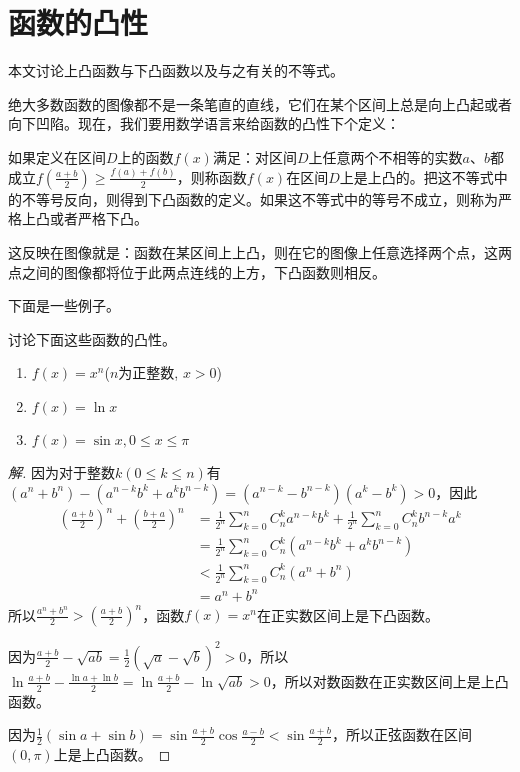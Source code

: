 
\section{函数的凸性}

本文讨论上凸函数与下凸函数以及与之有关的不等式。

绝大多数函数的图像都不是一条笔直的直线，它们在某个区间上总是向上凸起或者向下凹陷。现在，我们要用数学语言来给函数的凸性下个定义：
\begin{definition}
 如果定义在区间$D$上的函数$f(x)$满足：对区间$D$上任意两个不相等的实数$a$、$b$都成立$f(\frac{a+b}{2}) \geqslant \frac{f(a)+f(b)}{2}$，则称函数$f(x)$在区间$D$上是上凸的。把这不等式中的不等号反向，则得到下凸函数的定义。如果这不等式中的等号不成立，则称为严格上凸或者严格下凸。
\end{definition}
这反映在图像就是：函数在某区间上上凸，则在它的图像上任意选择两个点，这两点之间的图像都将位于此两点连线的上方，下凸函数则相反。

下面是一些例子。

\begin{example}
  讨论下面这些函数的凸性。
  \begin{enumerate}
  \item $f(x)=x^n$($n$为正整数, $x>0$)
  \item $f(x)=\ln{x}$
  \item $f(x)=\sin{x}, 0 \leqslant x \leqslant \pi$
  \end{enumerate}
\end{example}

\begin{proof}[解]
因为对于整数$k(0\leqslant k \leqslant n)$有$(a^n+b^n)-(a^{n-k}b^k+a^kb^{n-k})=(a^{n-k}-b^{n-k})(a^k-b^k)>0$，因此
\begin{equation}
  \begin{split}
\left( \frac{a+b}{2} \right)^n + \left( \frac{b+a}{2} \right)^n & = \frac{1}{2^n} \sum_{k=0}^nC_n^ka^{n-k}b^k + \frac{1}{2^n}\sum_{k=0}^nC_n^kb^{n-k}a^k \\
& = \frac{1}{2^n} \sum_{k=0}^n C_n^k \left( a^{n-k}b^k+a^kb^{n-k} \right) \\
& < \frac{1}{2^n} \sum_{k=0}^n C_n^k \left( a^n+b^n \right) \\
& = a^n+b^n
\end{split}
\end{equation}
所以$\frac{a^n+b^n}{2}>\left( \frac{a+b}{2} \right)^n$，函数$f(x)=x^n$在正实数区间上是下凸函数。

因为$\frac{a+b}{2}-\sqrt{ab}=\frac{1}{2}(\sqrt{a}-\sqrt{b})^2>0$，所以 $\ln{\frac{a+b}{2}}-\frac{\ln{a}+\ln{b}}{2}=\ln{\frac{a+b}{2}}-\ln{\sqrt{ab}}>0$，所以对数函数在正实数区间上是上凸函数。

因为$\frac{1}{2}(\sin{a}+\sin{b})=\sin{\frac{a+b}{2}}\cos{\frac{a-b}{2}} < \sin{\frac{a+b}{2}}$，所以正弦函数在区间$(0,\pi)$上是上凸函数。
\end{proof}

